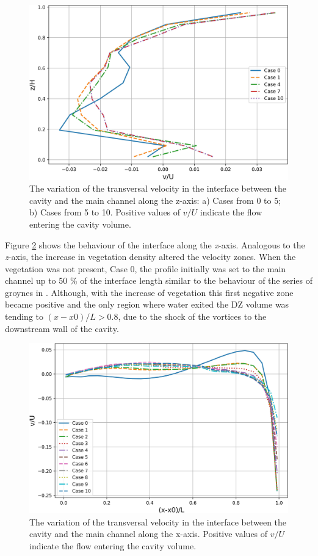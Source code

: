 \begin{figure}[!ht]
\centering
\includegraphics[width=\linewidth]{../images/art4/yVelatInterfaceZAxis.jpg}
\caption{The variation of the transversal velocity in the interface between the cavity and the main channel along the z-axis: a) Cases from 0 to 5; b) Cases from 5 to 10. Positive values of $v/U$ indicate the flow entering the cavity volume.}
\label{fig:art4:yVelatInterfaceZAxis}
\end{figure}

Figure \ref{fig:art4:yVelatInterfaceXAxis} shows the behaviour of the interface along the \textit{x}-axis. Analogous to the \textit{z}-axis, the increase in vegetation density altered the velocity zones. When the vegetation was not present, Case 0, the profile initially was set to the main channel up to 50 \% of the interface length similar to the behaviour of the series of groynes in \textcite{weitbrecht2004}. Although, with the increase of vegetation this first negative zone became positive and the only region where water exited the DZ volume was tending to $(x-x0)/L > 0.8$, due to the shock of the vortices to the downstream wall of the cavity.

\begin{figure}[!ht]
\centering
\includegraphics[width=\linewidth]{../images/art4/yVelatInterfaceXAxis.jpg}
\caption{The variation of the transversal velocity in the interface between the cavity and the main channel along the x-axis. Positive values of $v/U$ indicate the flow entering the cavity volume.}
\label{fig:art4:yVelatInterfaceXAxis}
\end{figure}

